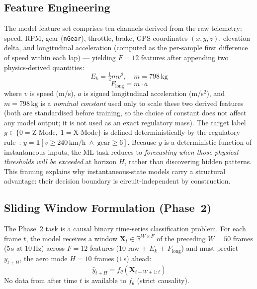 \documentclass[conference,a4paper]{IEEEtran}
\begin{document}
\subsection{Feature Engineering}

The model feature set comprises ten channels derived from the raw telemetry: speed, RPM,
gear (\texttt{nGear}), throttle, brake, GPS coordinates $(x, y, z)$, elevation delta, and
longitudinal acceleration (computed as the per-sample first difference of speed within each
lap) — yielding $F = 12$ features after appending two physics-derived quantities:
\begin{equation}
  E_k = \tfrac{1}{2} m v^2, \quad m = 798\,\text{kg}
  \label{eq:ke}
\end{equation}
\begin{equation}
  F_{\text{long}} = m \cdot a
  \label{eq:force}
\end{equation}
where $v$ is speed (m/s), $a$ is signed longitudinal acceleration (m/s$^2$), and
$m = 798\,\text{kg}$ is a \emph{nominal constant} used only to scale these two derived
features (both are standardised before training, so the choice of constant does not
affect any model output; it is not used as an exact regulatory mass).
The target label $y \in \{0\!=\!\text{Z-Mode},\;1\!=\!\text{X-Mode}\}$ is defined
deterministically by the regulatory rule~\cite{ref_fia2026}:
$y = \mathbf{1}[v \geq 240\,\text{km/h} \;\wedge\; \text{gear} \geq 6]$.
Because $y$ is a deterministic function of instantaneous inputs, the ML task reduces
to \emph{forecasting when those physical thresholds will be exceeded} at horizon $H$,
rather than discovering hidden patterns.
This framing explains why instantaneous-state models carry a structural advantage:
their decision boundary is circuit-independent by construction.

\subsection{Sliding Window Formulation (Phase~2)}

The Phase~2 task is a causal binary time-series classification problem.
For each frame $t$, the model receives a window
$\mathbf{X}_t \in \mathbb{R}^{W \times F}$ of the preceding $W = 50$ frames
($5$\,s at 10\,Hz) across $F = 12$ features ($10$ raw $+$ $E_k$ $+$ $F_{\text{long}}$) and must predict $y_{t+H}$,
the aero mode $H = 10$ frames ($1$\,s) ahead:
\begin{equation}
  \hat{y}_{t+H} = f_\theta(\mathbf{X}_{t-W+1:t})
  \label{eq:task}
\end{equation}
No data from after time $t$ is available to $f_\theta$ (strict causality).
\end{document}

